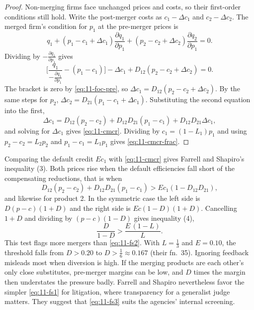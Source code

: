 \begin{proof}
Non-merging firms face unchanged prices and costs, so their first-order conditions still hold. Write the post-merger
costs as $c_1 - \Delta c_1$ and $c_2 - \Delta c_2$. The merged firm's condition for $p_1$ at the pre-merger prices is
\begin{equation*}
  q_1 + (p_1 - c_1 + \Delta c_1)\frac{\partial q_1}{\partial p_1} + (p_2 - c_2 + \Delta c_2)\frac{\partial q_2}{\partial p_1} = 0 .
\end{equation*}
Dividing by $-\frac{\partial q_1}{\partial p_1}$ gives
\begin{equation*}
  \Big[\frac{q_1}{-\frac{\partial q_1}{\partial p_1}} - (p_1 - c_1)\Big] - \Delta c_1 + D_{12}(p_2 - c_2 + \Delta c_2) = 0 .
\end{equation*}
The bracket is zero by \eqref{eq:11-foc-pre}, so $\Delta c_1 = D_{12}(p_2 - c_2 + \Delta c_2)$. By the same steps for
$p_2$, $\Delta c_2 = D_{21}(p_1 - c_1 + \Delta c_1)$. Substituting the second equation into the first,
\begin{equation*}
  \Delta c_1 = D_{12}(p_2 - c_2) + D_{12}D_{21}(p_1 - c_1) + D_{12}D_{21}\Delta c_1 ,
\end{equation*}
and solving for $\Delta c_1$ gives \eqref{eq:11-cmcr}. Dividing by $c_1 = (1 - L_1)p_1$ and using
$p_2 - c_2 = L_2 p_2$ and $p_1 - c_1 = L_1 p_1$ gives \eqref{eq:11-cmcr-frac}.
\end{proof}

Comparing the default credit $E c_1$ with \eqref{eq:11-cmcr} gives Farrell and Shapiro's inequality (3). Both prices
rise when the default efficiencies fall short of the compensating reductions, that is when
\begin{equation}\label{eq:11-fs3}
  D_{12}(p_2 - c_2) + D_{12}D_{21}(p_1 - c_1) > E c_1 (1 - D_{12}D_{21}) ,
\end{equation}
and likewise for product 2. In the symmetric case the left side is $D(p-c)(1 + D)$ and the right side is
$Ec(1 - D)(1 + D)$. Cancelling $1 + D$ and dividing by $(p - c)(1 - D)$ gives inequality (4),
\begin{equation}\label{eq:11-fs4}
  \frac{D}{1 - D} > \frac{E\,(1 - L)}{L} .
\end{equation}
This test flags more mergers than \eqref{eq:11-fs2}. With $L = \frac{1}{3}$ and $E = 0.10$, the threshold falls from
$D > 0.20$ to $D > \frac{1}{6} \approx 0.167$ (their fn.~35). Ignoring feedback misleads most when diversion is high.
If the merging products are each other's only close substitutes, pre-merger margins can be low, and $D$ times the
margin then understates the pressure badly. Farrell and Shapiro nevertheless favor the simpler \eqref{eq:11-fs1} for
litigation, where transparency for a generalist judge matters. They suggest that \eqref{eq:11-fs3} suits the
agencies' internal screening.

